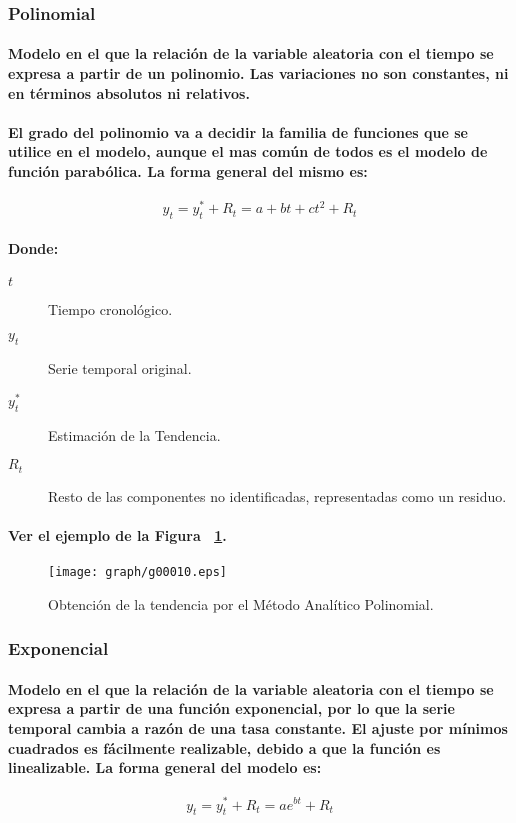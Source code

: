\subsubsection{Polinomial}
\paragraph{
Modelo en el que la relación de la variable aleatoria con el tiempo se expresa a partir de un polinomio. Las variaciones no son constantes, ni en términos absolutos ni relativos.
}
\paragraph{
El grado del polinomio va a decidir la familia de funciones que se utilice en el modelo, aunque el mas común de todos es el modelo de función parabólica. La forma general del mismo es:
}
\begin{equation}
y_t = y_t^* + R_t = a + bt + ct^2 + R_t
\end{equation}
\paragraph{
Donde:
}
\begin{description}
\item[$t$] Tiempo cronológico.
\item[$y_t$] Serie temporal original.
\item[$y_t^*$] Estimación de la Tendencia.
\item[$R_t$] Resto de las componentes no identificadas, representadas como un residuo.
\end{description}
\paragraph{
Ver el ejemplo de la Figura ~\ref{fig:TendenciaMetodoAnaliticoPolinomial}.
}
\begin{figure}[ht]
\centering
\texttt{[image: graph/g00010.eps]}
\caption[Método Analítico Polinomial]{Obtención de la tendencia por el Método Analítico Polinomial.}
\label{fig:TendenciaMetodoAnaliticoPolinomial}
\end{figure}

\subsubsection{Exponencial}
\paragraph{
Modelo en el que la relación de la variable aleatoria con el tiempo se expresa a partir de una función exponencial, por lo que la serie temporal cambia a razón de una tasa constante. El ajuste por mínimos cuadrados es fácilmente realizable, debido a que la función es linealizable. La forma general del modelo es:
}
\begin{equation}
y_t = y_t^* + R_t = a e^{bt} + R_t
\end{equation}
